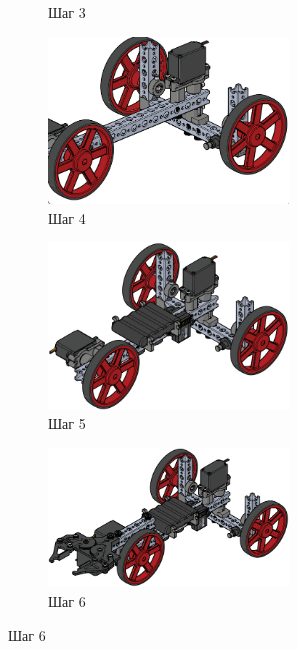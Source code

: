 \begin{figure}[h]
\begin{subfigure}[b]{0.45\textwidth}
        \caption*{Шаг 3}
    \end{subfigure}
    \begin{subfigure}[b]{0.45\textwidth}
        \centering
        \includegraphics[width=0.7\textwidth]{fig/assembly/4.4.png}
        \caption*{Шаг 4}
    \end{subfigure}
    \begin{subfigure}[b]{0.45\textwidth}
        \centering
        \includegraphics[width=0.7\textwidth]{fig/assembly/4.5.png}
        \caption*{Шаг 5}
    \end{subfigure}
    \begin{subfigure}[b]{0.45\textwidth}
        \flushright
        \includegraphics[width=0.7\textwidth]{fig/assembly/4.6.png}
        \caption*{Шаг 6}
    \end{subfigure}
\end{figure}

